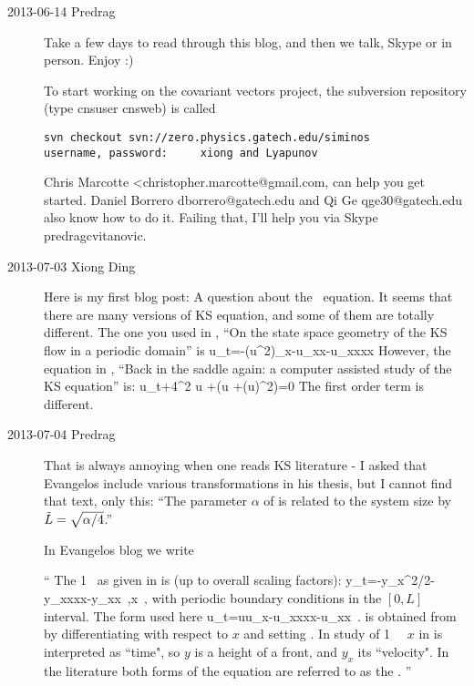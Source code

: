 \begin{description}
\item[2013-06-14 Predrag]
Take a few days to read through this blog, and then we talk,
Skype or in person.
Enjoy :)

To start working on the covariant vectors project,
the
 {subversion repository}
(type   cnsuser   cnsweb) is called
\begin{verbatim}
svn checkout svn://zero.physics.gatech.edu/siminos
username, password:     xiong and Lyapunov
\end{verbatim}
Chris Marcotte <christopher.marcotte@gmail.com, can help you get
started. Daniel Borrero dborrero@gatech.edu and Qi Ge
    qge30@gatech.edu also know how to do it. Failing that, I'll help
you via Skype predragcvitanovic.

\item[2013-07-03 Xiong Ding] Here is my first blog post:
A question about the \KS\ equation.
It seems that there are many versions of KS equation,
and some of them are totally different.
The one you used in , ``On the state space geometry of
the KS flow in a periodic domain'' is
\beq
 u_t=-(u^2)_x-u_{xx}-u_{xxxx}  However, the
equation in , ``Back in the saddle again: a computer
assisted study of the KS equation'' is:
\beq
 u_t+4\bigtriangleup^2 u
    +\alpha (\bigtriangleup u +(\bigtriangledown u)^2)=0
The first order term is different.

\item[2013-07-04 Predrag] That is always annoying when one reads
KS literature - I asked that Evangelos include various transformations
in his thesis, but I cannot find that text, only this:
``The parameter $\alpha$ of  is
related to the system size by $\tildeL=\sqrt{\alpha/4}$.''

In Evangelos
 {blog} we write

``
The {1\dmn} \KSe\ as given in  is (up to overall scaling
factors):
\beq
    y_t=-y_x^2/2-y_{xxxx}-y_{xx}
\,,\qquad       x \in [0,L]
\,,
    \label{eq:KSeOR}
\eeq
with periodic boundary conditions in the $[0,L]$ interval. The form used
here
\beq
    u_t=uu_x-u_{xxxx}-u_{xx}
\,.
    \label{eq:KSeAP}
\eeq
is obtained from  by differentiating with respect to $x$
and setting .
In study of {1\dmn} \KS\ \eqva\ $x$ in 
is interpreted as ``time", so $y$ is a height of a front,
and $y_x$ its ``velocity".
In the literature  both forms of the equation are
referred to as the \KSe.
''


\end{description}
